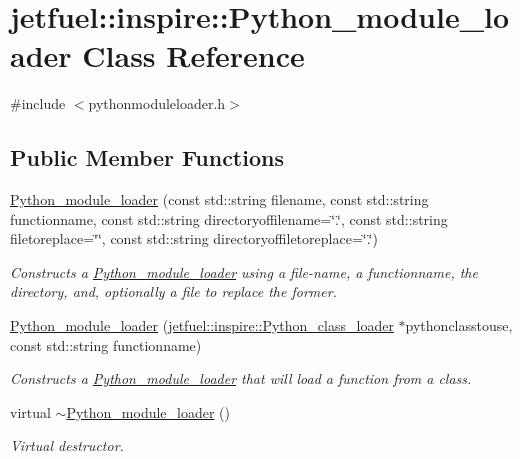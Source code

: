 \hypertarget{classjetfuel_1_1inspire_1_1Python__module__loader}{}\section{jetfuel\+:\+:inspire\+:\+:Python\+\_\+module\+\_\+loader Class Reference}
\label{classjetfuel_1_1inspire_1_1Python__module__loader}


{\ttfamily \#include $<$pythonmoduleloader.\+h$>$}

\subsection*{Public Member Functions}
\begin{DoxyCompactItemize}
\item 
\hyperlink{classjetfuel_1_1inspire_1_1Python__module__loader_a30ab85906d5365ca34ca47b456460353}{Python\+\_\+module\+\_\+loader} (const std\+::string filename, const std\+::string functionname, const std\+::string directoryoffilename=\char`\"{}.\char`\"{}, const std\+::string filetoreplace=\char`\"{}\char`\"{}, const std\+::string directoryoffiletoreplace=\char`\"{}.\char`\"{})
\begin{DoxyCompactList}\small\item\em Constructs a \hyperlink{classjetfuel_1_1inspire_1_1Python__module__loader}{Python\+\_\+module\+\_\+loader} using a file-\/name, a functionname, the directory, and, optionally a file to replace the former. \end{DoxyCompactList}\item 
\hyperlink{classjetfuel_1_1inspire_1_1Python__module__loader_addb900473108ecea10d36eceb9917920}{Python\+\_\+module\+\_\+loader} (\hyperlink{classjetfuel_1_1inspire_1_1Python__class__loader}{jetfuel\+::inspire\+::\+Python\+\_\+class\+\_\+loader} $\ast$pythonclasstouse, const std\+::string functionname)
\begin{DoxyCompactList}\small\item\em Constructs a \hyperlink{classjetfuel_1_1inspire_1_1Python__module__loader}{Python\+\_\+module\+\_\+loader} that will load a function from a class. \end{DoxyCompactList}\item 
virtual \hyperlink{classjetfuel_1_1inspire_1_1Python__module__loader_a87c6c13c50ca78e59e19d291355a8bc5}{$\sim$\+Python\+\_\+module\+\_\+loader} ()
\begin{DoxyCompactList}\small\item\em Virtual destructor. \end{DoxyCompactList}\item 

\end{DoxyCompactItemize}
